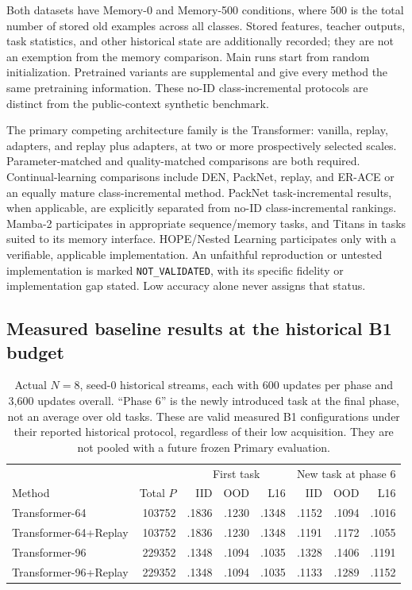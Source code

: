 Both datasets have Memory-0 and Memory-500 conditions, where 500 is the total
number of stored old examples across all classes. Stored features, teacher
outputs, task statistics, and other historical state are additionally recorded;
they are not an exemption from the memory comparison. Main runs start from
random initialization. Pretrained variants are supplemental and give every
method the same pretraining information. These no-ID class-incremental
protocols are distinct from the public-context synthetic benchmark.

The primary competing architecture family is the Transformer: vanilla, replay,
adapters, and replay plus adapters, at two or more prospectively selected scales.
Parameter-matched and quality-matched comparisons are both required.
Continual-learning comparisons include DEN, PackNet, replay, and ER-ACE or an
equally mature class-incremental method. PackNet task-incremental results, when
applicable, are explicitly separated from no-ID class-incremental rankings.
Mamba-2 participates in appropriate sequence/memory tasks, and Titans in tasks
suited to its memory interface. HOPE/Nested Learning participates only with a
verifiable, applicable implementation. An unfaithful reproduction or untested
implementation is marked \texttt{NOT\_VALIDATED}, with its specific fidelity
or implementation gap stated. Low accuracy alone never assigns that status.

\subsection{Measured baseline results at the historical B1 budget}

\begin{table}[t]
\centering
\small
\begin{tabular}{lrrrrrrr}
\toprule
 & & \multicolumn{3}{c}{First task} & \multicolumn{3}{c}{New task at phase 6}\\
Method & Total $P$ & IID & OOD & L16 & IID & OOD & L16\\
\midrule
Transformer-64 &103752&.1836&.1230&.1348&.1152&.1094&.1016\\
Transformer-64+Replay &103752&.1836&.1230&.1348&.1191&.1172&.1055\\
Transformer-96 &229352&.1348&.1094&.1035&.1328&.1406&.1191\\
Transformer-96+Replay &229352&.1348&.1094&.1035&.1133&.1289&.1152\\
\bottomrule
\end{tabular}
\caption{Actual $N=8$, seed-0 historical streams, each with 600 updates per
phase and 3,600 updates overall. ``Phase 6'' is the newly introduced task at
the final phase, not an average over old tasks. These are valid measured B1
configurations under their reported historical protocol, regardless of their
low acquisition. They are not pooled with a future frozen Primary evaluation.}
\label{tab:historical-transformers}
\end{table}

